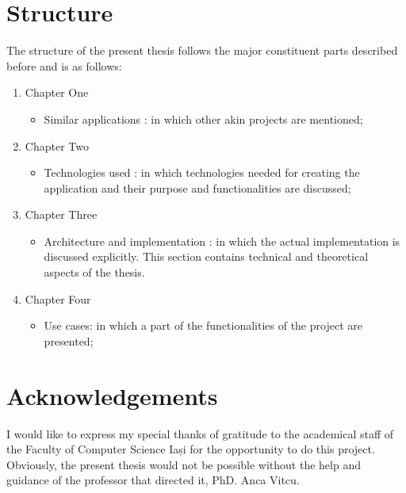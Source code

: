 	\section{Structure}
	The structure of the present thesis follows the major constituent parts described before and is as follows:
	\begin{enumerate}
	\item Chapter One
		\begin{itemize}
			\item Similar applications :  in which other akin projects are mentioned;
		\end{itemize}

	\item Chapter Two
		\begin{itemize}
			\item Technologies used : in which technologies needed for creating the application and their purpose and functionalities are discussed;

		\end{itemize}
	\item Chapter Three
		\begin{itemize}
		\item Architecture and implementation : in which the actual implementation is discussed explicitly. This section contains technical and theoretical aspects of the thesis.

		\end{itemize}
	\item Chapter Four
		\begin{itemize}
			\item Use cases: in which a part of the functionalities of the project are presented;

		\end{itemize}
	\end{enumerate}

 	\section{Acknowledgements}


	I would like to express my special thanks of gratitude to the academical staff of the Faculty of Computer Science Iași for the opportunity to do this project.\\

	Obviously, the present thesis would not be possible without the help and guidance of the professor that directed it, PhD. Anca Vitcu.
